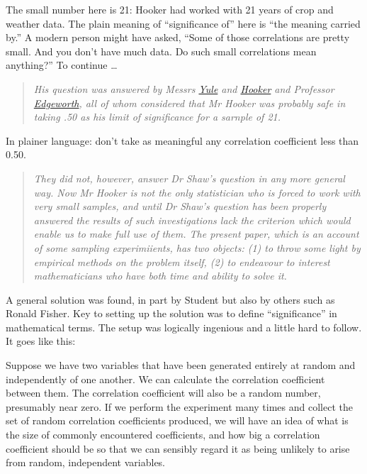 \documentclass[]{book}
\begin{document}
The small number here is 21: Hooker had worked with 21 years of crop and weather data. The plain meaning of ``significance of'' here is ``the meaning carried by.'' A modern person might have asked, ``Some of those correlations are pretty small. And you don't have much data. Do such small correlations mean anything?'' To continue \ldots{}

\begin{quote}
\emph{His question was answered by Messrs \href{https://en.wikipedia.org/wiki/Udny_Yule}{Yule} and \href{https://en.wikipedia.org/wiki/Reginald_Hawthorn_Hooker}{Hooker} and Professor \href{https://en.wikipedia.org/wiki/Francis_Ysidro_Edgeworth}{Edgeworth}, all of whom considered that Mr Hooker was probably safe in taking .50 as his limit of significance for a sarnple of 21.}
\end{quote}

In plainer language: don't take as meaningful any correlation coefficient less than 0.50.

\begin{quote}
\emph{They did not, however, answer Dr Shaw's question in any more general way. Now Mr Hooker is not the only statistician who is forced to work with very small samples, and until Dr Shaw's question has been properly answered the results of such investigations lack the criterion which would enable us to make full use of them. The present paper, which is an account of some sampling experimiients, has two objects: (1) to throw some light by empirical methods on the problem itself, (2) to endeavour to interest mathematicians who have both time and ability to solve it.}
\end{quote}

A general solution was found, in part by Student but also by others such as Ronald Fisher. Key to setting up the solution was to define ``significance'' in mathematical terms. The setup was logically ingenious and a little hard to follow. It goes like this:

Suppose we have two variables that have been generated entirely at random and independently of one another. We can calculate the correlation coefficient between them. The correlation coefficient will also be a random number, presumably near zero. If we perform the experiment many times and collect the set of random correlation coefficients produced, we will have an idea of what is the size of commonly encountered coefficients, and how big a correlation coefficient should be so that we can sensibly regard it as being unlikely to arise from random, independent variables.
\end{document}
